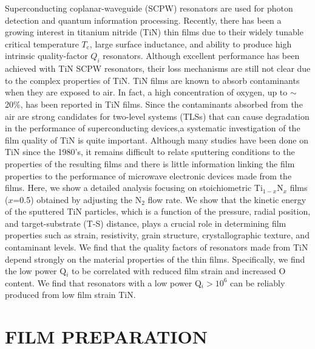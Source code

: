 Superconducting coplanar-waveguide (SCPW) resonators are used for photon detection and quantum information processing. Recently, there has been a growing interest in titanium nitride (TiN) thin films due to their widely tunable critical temperature $T_{\text{c}}$, large surface inductance, and ability to produce high intrinsic quality-factor $Q_{i}$ resonators.\cite{Leduc2010, Vissers2010, Sage2011, Vissers2012, Diener2012, Mazin2012, Cecil2012, Noroozian2012, Calvo2012, Eom2012, Krocknberger2012, Driessen2012} Although excellent performance has been achieved with TiN SCPW resonators, their loss mechanisms are still not clear due to the complex properties of TiN.  TiN films are known to absorb contaminants when they are exposed to air.\cite{Kumar1988, Mandl1990,Logothetidis1999} In fact, a high concentration of oxygen, up to $\sim$20\%, has been reported in TiN films.\cite{Chowdhury1996, Chappe2007, Radecka2011} Since the contaminants absorbed from the air are strong candidates for two-level systems (TLSs) that can cause degradation in the performance of superconducting devices,\cite{Martinis2005}a systematic investigation of the film quality of TiN is quite important. Although many studies have been done on TiN since the 1980's, it remains difficult to relate sputtering conditions to the properties of the resulting films and there is little information linking the film properties to the performance of microwave electronic devices made from the films. Here, we show a detailed analysis focusing on stoichiometric Ti$_{1-x}$N$_{x}$ films ($x$=0.5) obtained by adjusting the N$_{2}$ flow rate.  We show that the kinetic energy of the sputtered TiN particles, which is a function of the pressure, radial position, and target-substrate (T-S) distance, plays a crucial role in determining film properties such as strain, resistivity, grain structure, crystallographic texture, and contaminant levels.  We find that the quality factors of resonators made from TiN depend strongly on the material properties of the thin films.  Specifically, we find the low power Q$_{i}$ to be correlated with reduced film strain and increased O content.  We find that resonators with a low power Q$_{i} > 10^{6}$ can be reliably produced from low film strain TiN.

\section{FILM PREPARATION}

